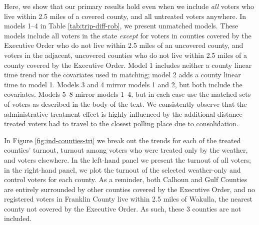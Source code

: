 \documentclass[
  12pt,
]{article}
\begin{document}
Here, we show that our primary results hold even when we include \emph{all} voters who live within 2.5 miles of a covered county, and all untreated voters anywhere. In models 1--4 in Table \ref{tab:trip-diff-rob}, we present unmatched models. These models include all voters in the state \emph{except} for voters in counties covered by the Executive Order who do not live within 2.5 miles of an uncovered county, and voters in the adjacent, uncovered counties who do not live within 2.5 miles of a county covered by the Executive Order. Model 1 includes neither a county linear time trend nor the covariates used in matching; model 2 adds a county linear time to model 1. Models 3 and 4 mirror models 1 and 2, but both include the covariates. Models 5--8 mirror models 1--4, but in each case use the matched sets of voters as described in the body of the text. We consistently observe that the administrative treatment effect is highly influenced by the additional distance treated voters had to travel to the closest polling place due to consolidation.

\begin{landscape}
\begin{singlespace}

\end{singlespace}
\end{landscape}

In Figure \ref{fig:ind-counties-tri} we break out the trends for each of the treated counties' turnout, turnout among voters who were treated only by the weather, and voters elsewhere. In the left-hand panel we present the turnout of all voters; in the right-hand panel, we plot the turnout of the selected weather-only and control voters for each county. As a reminder, both Calhoun and Gulf Counties are entirely surrounded by other counties covered by the Executive Order, and no registered voters in Franklin County live within 2.5 miles of Wakulla, the nearest county not covered by the Executive Order. As such, these 3 counties are not included.
\end{document}
